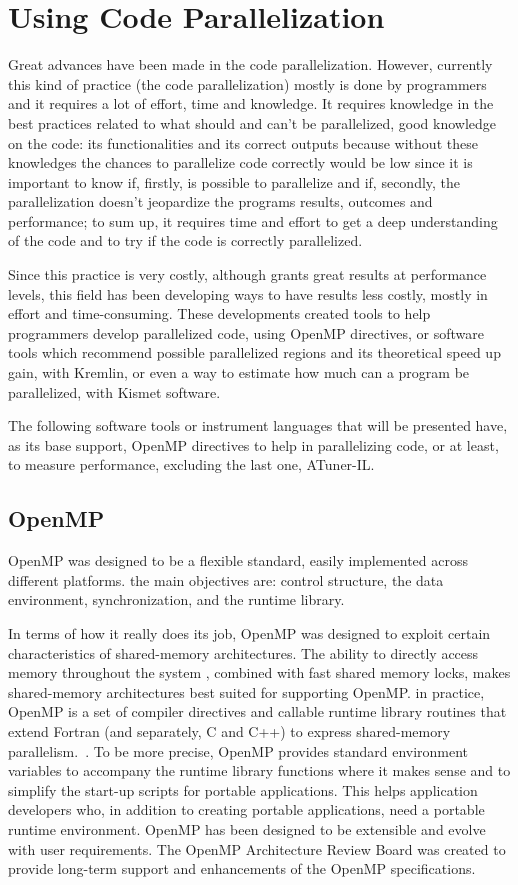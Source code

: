 \section{Using Code Parallelization}\label{sec:codeparallelization}
Great advances have been made in the code parallelization. However, currently this kind of practice (the code parallelization) mostly is done by programmers and it requires a lot of effort, time and knowledge. It requires knowledge in the best practices related to what should and can't be parallelized, good knowledge on the code: its functionalities and its correct outputs because without these knowledges the chances to parallelize code correctly would be low since it is important to know if, firstly, is possible to parallelize and if, secondly, the parallelization doesn't jeopardize the programs results, outcomes and performance; to sum up, it requires time and effort to get a deep understanding of the code and to try if the code is correctly parallelized.~\cite{Jeon}

Since this practice is very costly, although grants great results at performance levels, this field has been developing ways to have results less costly, mostly in effort and time-consuming. These developments created tools to help programmers develop parallelized code, using OpenMP directives, or software tools which recommend possible parallelized regions and its theoretical speed up gain, with Kremlin, or even a way to estimate how much can a program be parallelized, with Kismet software.~\cite{Saturnino}

The following software tools or instrument languages that will be presented have, as its base support, OpenMP directives to help in parallelizing code, or at least, to measure performance, excluding the last one, ATuner-IL.

\subsection{OpenMP}
OpenMP was designed to be a flexible standard, easily implemented across different platforms. the main objectives are: control structure, the data environment, synchronization, and the runtime library. 

In terms of how it really does its job, OpenMP was designed to exploit certain characteristics of shared-memory architectures. The ability to directly access memory throughout the system , combined with fast shared memory locks, makes shared-memory architectures best suited for supporting OpenMP. in practice, OpenMP is a set of compiler directives and callable runtime library routines that extend Fortran (and separately, C and C++) to express shared-memory parallelism.~\cite{Nc1998}. To be more precise, OpenMP provides standard environment variables to accompany the runtime library functions where it makes sense and to simplify  the start-up scripts for portable applications. This helps application developers who, in addition to creating portable applications, need a portable runtime environment. OpenMP has been designed to be extensible and evolve with user requirements. The OpenMP Architecture Review Board was created to provide long-term support and enhancements of the OpenMP specifications. 


